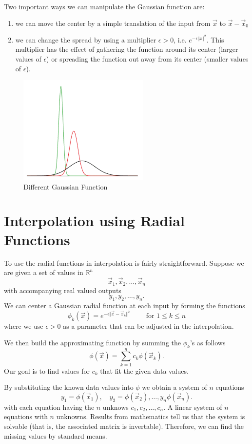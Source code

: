 \documentclass{article}
\begin{document}
Two important ways we can manipulate the Gaussian function are:
\begin{enumerate}
    \item we can move the center by a simple translation of the input from $\vec{x}$ to $\vec{x} - \vec{x}_0$
    \item we can change the spread by using a multiplier $\epsilon> 0$, i.e. $e^{-\epsilon \Vert x \Vert^2}$. 
    This multiplier has the effect of gathering the function around its center (larger values of $\epsilon$) or
    spreading the function out away from its center (smaller values of $\epsilon$).
\end{enumerate}

\begin{figure}[h]
    \centering
    \includegraphics[scale=0.6]{gauss_diff.png}
    \caption{Different Gaussian Function}
\end{figure}

\section*{Interpolation using Radial Functions}
To use the radial functions in interpolation is fairly straightforward.
Suppose we are given a set of values in $\mathbb{R}^n$
\[
\vec{x}_1, \vec{x}_2, \dots, \vec{x}_n
\]
with accompanying real valued outputs
\[
y_1, y_2, \dots, y_n.    
\]
We can center a Gaussian radial function at each input by forming the functions
\[
\phi_k(\vec{x}) = e^{-\epsilon \Vert \vec{x} - \vec{x}_k \Vert^2}    \qquad \text{ for $1 \leq k \leq n$} 
\]
where we use $\epsilon > 0$ as a parameter that can be adjusted in the interpolation.

We then build the approximating function by summing the $\phi_k$'s as follows
\[
\phi(\vec{x}) = \sum_{k=1}^n c_k \phi(\vec{x}_k).
\]
Our goal  is to find values for $c_k$ that fit the given data values. 

By substituting the known data values into $\phi$ we obtain a system of $n$ equations
\[
y_1 = \phi(\vec{x}_1), \quad y_2 = \phi(\vec{x}_2), \dots, y_n \phi(\vec{x}_n).
\]
with each equation having the $n$ unknows $c_1, c_2, \dots, c_n$.
A linear system of $n$ equations with $n$ unknowns. 
Results from mathematics tell us that the system is solvable (that is, the associated matrix is invertable).
Therefore, we can find the missing values by standard means.
\end{document}

